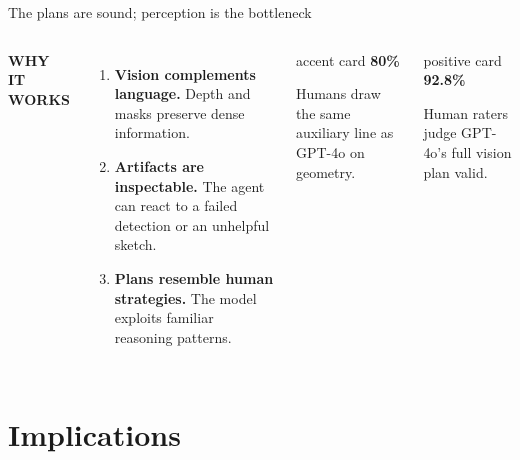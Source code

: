 \documentclass[10pt,aspectratio=169]{beamer}
\newcommand{\eyebrow}[1]{%
  {\color{Teal}\bfseries\fontsize{8}{9.5}\selectfont\MakeUppercase{#1}}%
}
\begin{document}
\begin{frame}{The plans are sound; perception is the bottleneck}
  \begin{columns}[T,onlytextwidth]
      \eyebrow{Why it works}\par
      \vspace{0.24cm}
      \begin{enumerate}
        \setlength{\itemsep}{0.45cm}
        \item \textbf{Vision complements language.} Depth and masks preserve dense information.
        \item \textbf{Artifacts are inspectable.} The agent can react to a failed detection or an unhelpful sketch.
        \item \textbf{Plans resemble human strategies.} The model exploits familiar reasoning patterns.
      \end{enumerate}

      \begin{beamercolorbox}[rounded=true,wd=\linewidth,ht=2.08cm,dp=0.12cm,sep=0.28cm]{accent card}
        {\fontsize{27}{29}\selectfont\bfseries\textcolor{Saffron!85!black}{80\%}}\par
        {\small Humans draw the same auxiliary line as GPT-4o on geometry.}
      \end{beamercolorbox}
      \vspace{0.25cm}
      \begin{beamercolorbox}[rounded=true,wd=\linewidth,ht=2.08cm,dp=0.12cm,sep=0.28cm]{positive card}
        {\fontsize{27}{29}\selectfont\bfseries\textcolor{TealDark}{92.8\%}}\par
        {\small Human raters judge GPT-4o's full vision plan valid.}
      \end{beamercolorbox}
  \end{columns}
\end{frame}

\section{Implications}
\end{document}
